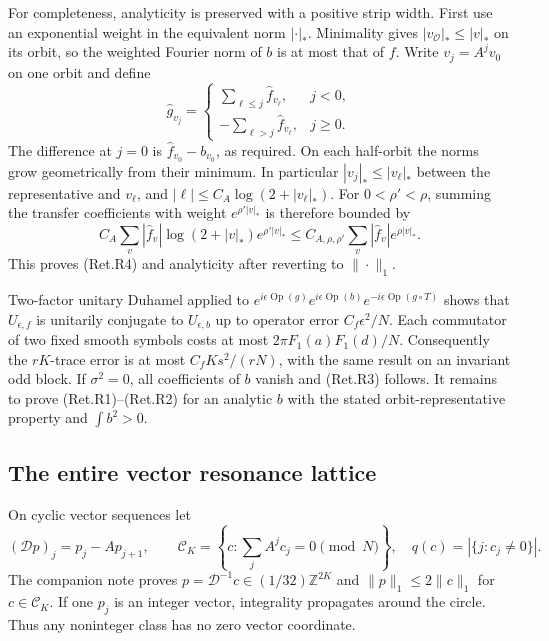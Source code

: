 For completeness, analyticity is preserved with a positive strip width.
First use an exponential weight in the equivalent norm \(|\cdot|_*\).
Minimality gives \(|v_{\mathcal O}|_*\le|v|_*\) on its orbit, so the
weighted Fourier norm of \(b\) is at most that of \(f\).
Write \(v_j=A^jv_0\) on one orbit and define
\[
 \widehat g_{v_j}=
 \begin{cases}
   \sum_{\ell\le j}\widehat f_{v_\ell},&j<0,\\
   -\sum_{\ell>j}\widehat f_{v_\ell},&j\ge0.
 \end{cases}
\]
The difference at \(j=0\) is \(\widehat f_{v_0}-b_{v_0}\), as required.
On each half-orbit the norms grow geometrically from their minimum.
In particular \(|v_j|_*\le|v_\ell|_*\) between the representative and
\(v_\ell\), and \(|\ell|\le C_A\log(2+|v_\ell|_*)\).
For \(0<\rho'<\rho\), summing the transfer coefficients with weight
\(e^{\rho'|v|_*}\) is therefore bounded by
\[
 C_A\sum_v|\widehat f_v|
                  \log(2+|v|_*)e^{\rho'|v|_*}
 \le C_{A,\rho,\rho'}\sum_v|\widehat f_v|e^{\rho|v|_*}.
\]
This proves (Ret.R4) and analyticity after reverting to \(\|\cdot\|_1\).

Two-factor unitary Duhamel applied to
\(e^{i\epsilon\operatorname{Op}(g)}  e^{i\epsilon\operatorname{Op}(b)}  e^{-i\epsilon\operatorname{Op}(g\circ T)}\)
shows that \(U_{\epsilon,f}\) is unitarily conjugate to \(U_{\epsilon,b}\)
up to operator error \(C_f\epsilon^2/N\). Each commutator of two fixed
smooth symbols costs at most \(2\pi F_1(a)F_1(d)/N\).
Consequently the \(rK\)-trace error is at most
\(C_fKs^2/(rN)\), with the same result on an invariant odd block.
If \(\sigma^2=0\), all coefficients of \(b\) vanish and (Ret.R3) follows.
It remains to prove (Ret.R1)--(Ret.R2) for an analytic \(b\) with the stated
orbit-representative property and \(\int b^2>0\).

\hypertarget{the-entire-vector-resonance-lattice}{%
\subsection{The entire vector resonance lattice}\label{the-entire-vector-resonance-lattice}}

On cyclic vector sequences let
\[
 (\mathcal Dp)_j=p_j-Ap_{j+1},\qquad
 \mathcal C_K=\left\{c:\sum_jA^jc_j=0\pmod N\right\},
 \quad q(c)=|\{j:c_j\ne0\}|.
\]
The companion note proves
\(p=\mathcal D^{-1}c\in(1/32)\mathbb Z^{2K}\) and
\(\|p\|_1\le2\|c\|_1\) for \(c\in\mathcal C_K\).
If one \(p_j\) is an integer vector, integrality propagates around the
circle. Thus any noninteger class has no zero vector coordinate.

